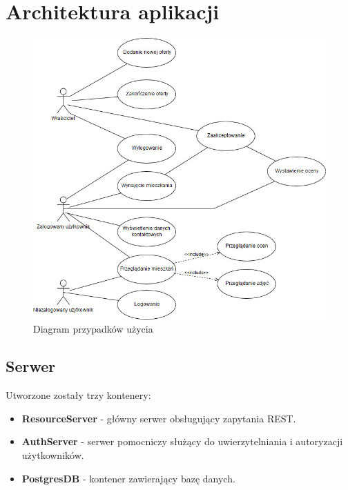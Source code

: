 \documentclass[polish, 11pt]{article}
\begin{document}
\section{Architektura aplikacji}
    \begin{figure}[H]
        \centering
        \includegraphics[width=\textwidth]{figures/UseCase.jpg}
        \caption{Diagram przypadków użycia}
    \end{figure}
    
    \subsection{Serwer}
        Utworzone zostały trzy kontenery:
        \begin{itemize}
            \item \textbf{ResourceServer} - główny serwer obsługujący zapytania REST.\\
            
            \item \textbf{AuthServer} - serwer pomocniczy służący do uwierzytelniania i autoryzacji użytkowników.\\
            
            \item \textbf{PostgresDB} - kontener zawierający bazę danych.\\
        
        \end{itemize}
        
\end{document}
